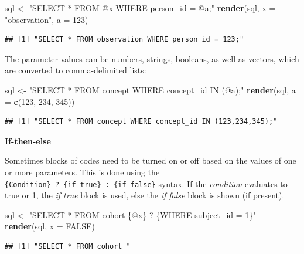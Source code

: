 \documentclass[11pt]{book}
\newenvironment{Shaded}{\begin{snugshade}}{\end{snugshade}}
\newcommand{\KeywordTok}[1]{\textcolor[rgb]{0.13,0.29,0.53}{\textbf{#1}}}
\newcommand{\DataTypeTok}[1]{\textcolor[rgb]{0.13,0.29,0.53}{#1}}
\newcommand{\DecValTok}[1]{\textcolor[rgb]{0.00,0.00,0.81}{#1}}
\newcommand{\StringTok}[1]{\textcolor[rgb]{0.31,0.60,0.02}{#1}}
\newcommand{\OtherTok}[1]{\textcolor[rgb]{0.56,0.35,0.01}{#1}}
\newcommand{\NormalTok}[1]{#1}
\begin{document}
\begin{Shaded}
\begin{Highlighting}[]
\NormalTok{sql <-}\StringTok{ "SELECT * FROM @x WHERE person_id = @a;"}
\KeywordTok{render}\NormalTok{(sql, }\DataTypeTok{x =} \StringTok{"observation"}\NormalTok{, }\DataTypeTok{a =} \DecValTok{123}\NormalTok{)}
\end{Highlighting}
\end{Shaded}

\begin{verbatim}
## [1] "SELECT * FROM observation WHERE person_id = 123;"
\end{verbatim}

The parameter values can be numbers, strings, booleans, as well as
vectors, which are converted to comma-delimited lists:

\begin{Shaded}
\begin{Highlighting}[]
\NormalTok{sql <-}\StringTok{ "SELECT * FROM concept WHERE concept_id IN (@a);"}
\KeywordTok{render}\NormalTok{(sql, }\DataTypeTok{a =} \KeywordTok{c}\NormalTok{(}\DecValTok{123}\NormalTok{, }\DecValTok{234}\NormalTok{, }\DecValTok{345}\NormalTok{))}
\end{Highlighting}
\end{Shaded}

\begin{verbatim}
## [1] "SELECT * FROM concept WHERE concept_id IN (123,234,345);"
\end{verbatim}

\textbf{If-then-else}

Sometimes blocks of codes need to be turned on or off based on the
values of one or more parameters. This is done using the
\texttt{\{Condition\}\ ?\ \{if\ true\}\ :\ \{if\ false\}} syntax. If the
\emph{condition} evaluates to true or 1, the \emph{if true} block is
used, else the \emph{if false} block is shown (if present).

\begin{Shaded}
\begin{Highlighting}[]
\NormalTok{sql <-}\StringTok{ "SELECT * FROM cohort \{@x\} ? \{WHERE subject_id = 1\}"}
\KeywordTok{render}\NormalTok{(sql, }\DataTypeTok{x =} \OtherTok{FALSE}\NormalTok{)}
\end{Highlighting}
\end{Shaded}

\begin{verbatim}
## [1] "SELECT * FROM cohort "
\end{verbatim}
\end{document}
